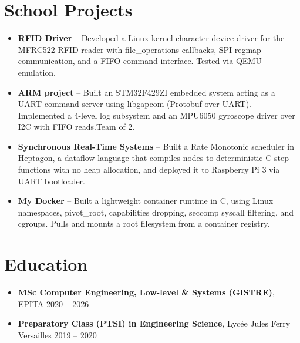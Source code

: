 \documentclass[9pt,a4paper]{article}
\begin{document}
\section*{School Projects}
\begin{tcolorbox}[mybox]
\begin{itemize}
\item \textbf{RFID Driver} -- Developed a Linux kernel character device driver for the MFRC522 RFID reader with file\_operations callbacks, SPI regmap communication, and a FIFO command interface. Tested via QEMU emulation.

\item \textbf{ARM project} -- Built an STM32F429ZI embedded system acting as a UART command server using libgapcom (Protobuf over UART). Implemented a 4-level log subsystem and an MPU6050 gyroscope driver over I2C with FIFO reads.Team of 2.

\item \textbf{Synchronous Real-Time Systems} -- Built a Rate Monotonic scheduler in Heptagon, a dataflow language that compiles nodes to deterministic C step functions with no heap allocation, and deployed it to Raspberry Pi 3 via UART bootloader.

\item \textbf{My Docker} -- Built a lightweight container runtime in C, using Linux namespaces, pivot\_root, capabilities dropping, seccomp syscall filtering, and cgroups. Pulls and mounts a root filesystem from a container registry.
\end{itemize}
\end{tcolorbox}


\section*{Education}
\begin{tcolorbox}[mybox]
\begin{itemize}
\item \textbf{MSc Computer Engineering, Low-level \& Systems (GISTRE)}, EPITA {\small{\hfill 2020 – 2026}}

\item \textbf{Preparatory Class (PTSI) in Engineering Science}, Lycée Jules Ferry Versailles {\small{\hfill 2019 – 2020}}
\end{itemize}
\end{tcolorbox}
\end{document}
